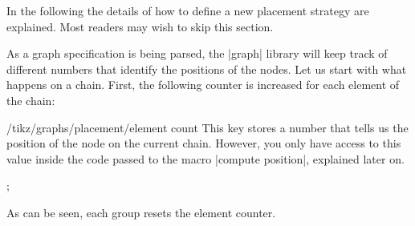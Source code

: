 In the following the details of how to define a new placement strategy
are explained. Most readers may wish to skip this section.

As a graph specification is being parsed, the |graph| library will keep
track of different numbers that identify the positions of the
nodes. Let us start with what happens on a chain. First, the following 
counter is increased for each element of the chain:
\begin{key}{/tikz/graphs/placement/element count}
  This key stores a number that tells us the position of the node on
  the current chain. However, you only have access to this value
  inside the code passed to the macro |compute position|, explained
  later on.
\begin{codeexample}[]
\tikz {};
\end{codeexample}
  As can be seen, each group resets the element counter.
\end{key}

